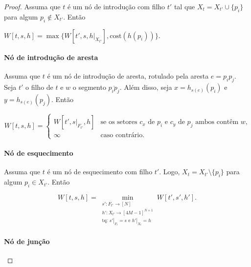 \documentclass[12pt]{article}
\newcommand{\cost}{\ensuremath{\text{cost}}}
\newcommand\rest[2]{\left.{#1}\right|_{#2}} %
\begin{document}
\begin{proof}
    Assuma que $t$ é um nó de introdução com filho $t'$ tal que \mbox{$X_t = X_{t'} \cup \{p_i\}$} para algum $p_i \notin X_{t'}$.
    Então

    $W[t, s, h] = \max\{W[t', s, \rest{h}{X_{t'}}], \cost(h(p_i))\}$.

    \paragraph{Nó de introdução de aresta}

    Assuma que $t$ é um nó de introdução de aresta, rotulado pela aresta $e=p_ip_j$. Seja $t'$ o filho de $t$ e $w$ o segmento $\overline{p_ip_j}$. Além disso, seja $x = h_{s(e)}(p_i)$ e $y = h_{s(e)}(p_j)$. Então
    \begin{center}
        \begin{equation*}
            W[t, s, h] =
            \begin{cases}
                W[t', \rest{s}{F_{t'}}, h] & \text{se os setores $c_x$ de $p_i$ e $c_y$ de $p_j$ ambos contêm $w$,} \\
                \infty                     & \text{caso contrário.}
            \end{cases}
        \end{equation*}
    \end{center}

    \paragraph{Nó de esquecimento}

    Assuma que $t$ é um nó de esquecimento com filho $t'$. Logo, $X_t = X_{t'} \setminus \{p_i\}$ para algum $p_i \in X_{t'}$. Então
    \begin{center}
        \begin{equation*}
            W[t, s, h] = \min_{\substack{
                    s'\colon F_{t'} \to [N] \\
                    h'\colon X_{t'} \to [4M-1]^{N+1} \\
                    \text{tq: } \rest{s'}{F_{t}} = s \text{ e } \rest{h'}{X_{t}} = h
                }} W[t', s', h'].
        \end{equation*}
    \end{center}

    \paragraph{Nó de junção}


\end{proof}
\end{document}
